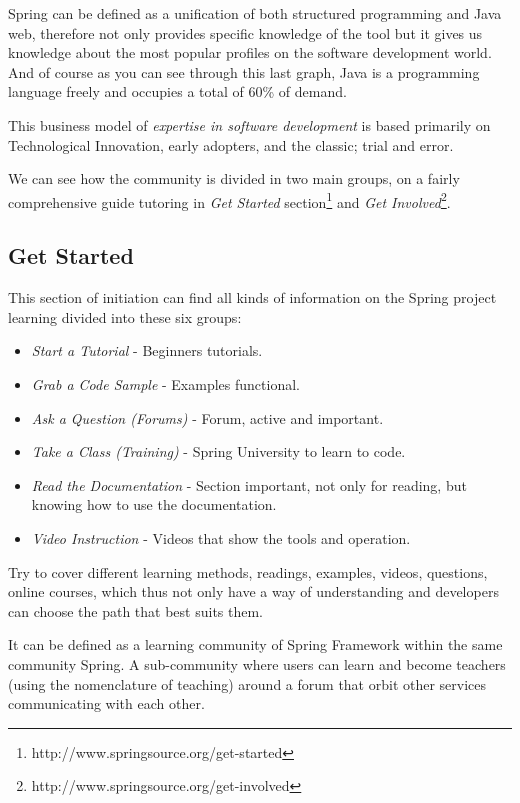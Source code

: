 \documentclass[11pt]{scrartcl}
\begin{document}
\par Spring can be defined as a unification of both structured programming and Java web, therefore not only provides specific knowledge of the tool but it gives us knowledge about the most popular profiles on the software development world. And of course as you can see through this last graph, Java is a programming language freely and occupies a total of 60\% of demand.

\par This business model of \emph{expertise in software development} is based primarily on Technological Innovation, early adopters, and the classic; trial and error.

\par We can see how the community is divided in two main groups, on a fairly comprehensive guide tutoring in \emph{Get Started} section\footnote{http://www.springsource.org/get-started} and \emph{Get Involved}\footnote{http://www.springsource.org/get-involved}.

\subsection{Get Started}

This section of initiation can find all kinds of information on the Spring project learning divided into these six groups:

\begin{itemize}
    \item \emph{Start a Tutorial} - Beginners tutorials.
    \item \emph{Grab a Code Sample} - Examples functional.
    \item \emph{Ask a Question (Forums)} - Forum, active and important.
    \item \emph{Take a Class (Training)} - Spring University to learn to code.
    \item \emph{Read the Documentation} - Section important, not only for reading, but knowing how to use the documentation.
    \item \emph{Video Instruction} - Videos that show the tools and operation.
\end{itemize}

\par Try to cover different learning methods, readings, examples, videos, questions, online courses, which thus not only have a way of understanding and developers can choose the path that best suits them.

\par It can be defined as a learning community of Spring Framework within the same community Spring. A sub-community where users can learn and become teachers (using the nomenclature of teaching) around a forum that orbit other services communicating with each other.
\end{document}
